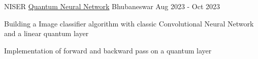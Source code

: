 \begin{cventries}
\cventry
{NISER} %
{\href{https://github.com/pritipriya-dasbehera/QNN_CP}{Quantum Neural Network}} %
{Bhubaneswar} %
{Aug 2023 - Oct 2023} %
{
	\begin{cvitems} %
		\item {Building a Image classifier algorithm with classic Convolutional Neural Network and a linear quantum layer}
		\item {Implementation of forward and backward pass on a quantum layer}\\
	\end{cvitems}
}


\end{cventries}

